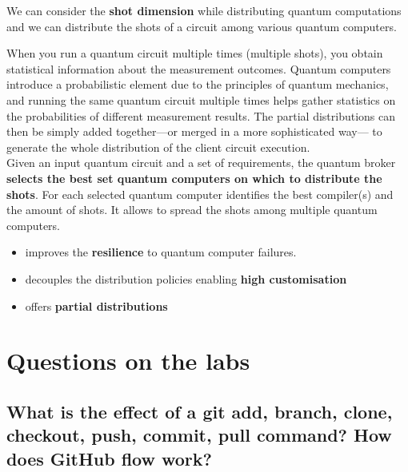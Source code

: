 We can consider the \textbf{shot dimension} while distributing quantum computations and we can distribute the shots of a circuit among various quantum computers.

When you run a quantum circuit multiple times (multiple shots), you obtain statistical information about the measurement outcomes. Quantum computers introduce a probabilistic element due to the principles of quantum mechanics, and running the same quantum circuit multiple times helps gather statistics on the probabilities of different measurement results.
The partial distributions can then be simply added together{---}or merged in a more sophisticated way{---} to generate the whole distribution of the client circuit execution.\\

Given an input quantum circuit and a set of requirements, the quantum broker \textbf{selects the best set quantum computers on which to distribute the shots}. For each selected quantum computer identifies the best compiler(s) and the amount of shots. It allows to spread the shots among multiple quantum computers.
\begin{itemize}
   \item improves the \textbf{resilience} to quantum computer failures.
   \item decouples the distribution policies enabling \textbf{high customisation}
   \item offers \textbf{partial distributions}
\end{itemize}


\chapter{Questions on the labs}
\section{What is the effect of a git add, branch, clone, checkout, push, commit, pull command? How does GitHub flow work?}
